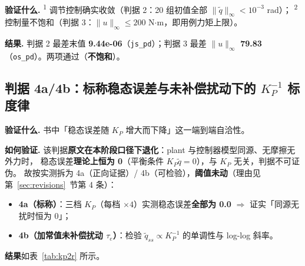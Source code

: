 \documentclass[11pt,a4paper]{ctexart}
\newcommand{\stage}[1]{\textsuperscript{#1}}
\begin{document}
\textbf{验证什么.} \stage{1} 调节控制确实收敛（判据 2：20 组初值全部 $\|\tilde q\|_\infty<10^{-3}$ rad）；
\stage{2} 控制量不饱和（判据 3：$\|u\|_\infty\le200$ N$\cdot$m，即用例力矩上限）。

\textbf{结果.} 判据 2 最差末值 \textbf{9.44e-06}（\texttt{js\_pd}）；判据 3 最差 $\|u\|_\infty$
\textbf{79.83}（\texttt{os\_pd}）。两项通过（\textbf{不饱和}）。

\subsection{判据 4a/4b：标称稳态误差与未补偿扰动下的 $K_P^{-1}$ 标度律}

\textbf{验证什么.} 书中「稳态误差随 $K_P$ 增大而下降」这一端到端自洽性。

\textbf{如何验证.} 该判据\textbf{原文在本阶段口径下退化}：plant 与控制器模型同源、无摩擦无外力时，
稳态误差\textbf{理论上恒为 0}（平衡条件 $K_P\tilde q=0$），与 $K_P$ 无关，判据不可证伪。
故按实测拆为 4a（正向证据）/ 4b（可检验），\textbf{阈值未动}（理由见第~\ref{sec:revisions}~节第 4 条）：

\begin{itemize}[leftmargin=1.6em,itemsep=2pt]
\item \textbf{4a（标称）}：三档 $K_P$（每档 $\times4$）实测稳态误差\textbf{全部为 0.0}
  $\Rightarrow$ 证实「同源无扰时恒为 0」；
\item \textbf{4b（加常值未补偿扰动 $\tau_e$）}：检验 $\tilde q_{ss}\propto K_P^{-1}$ 的单调性与
  log-log 斜率。
\end{itemize}

\textbf{结果}如表~\ref{tab:kp2r} 所示。

\begin{table}[H]
\centering
\small
\caption{2R 上 $K_P$ 扫描的标度律（判据 4b）}\label{tab:kp2r}
\end{table}
\end{document}
